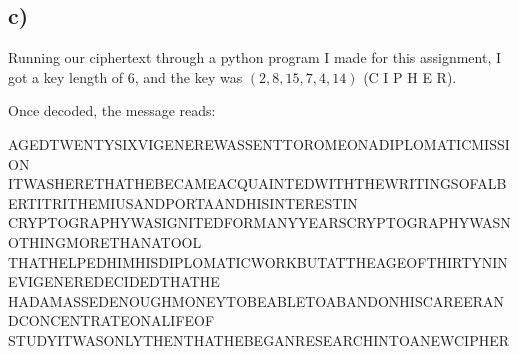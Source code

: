 \documentclass{article}
\begin{document}
\subsection*{c)}
Running our ciphertext through a python program I made for this assignment, I got
a key length of 6, and the key was $(2,8,15,7,4,14)$ (C I P H E R).

Once decoded, the message reads:

AGEDTWENTYSIXVIGENEREWASSENTTOROMEONADIPLOMATICMISSION
ITWASHERETHATHEBECAMEACQUAINTEDWITHTHEWRITINGSOFALBERTITRITHEMIUSANDPORTAANDHISINTERESTIN
CRYPTOGRAPHYWASIGNITEDFORMANYYEARSCRYPTOGRAPHYWASNOTHINGMORETHANATOOL
THATHELPEDHIMHISDIPLOMATICWORKBUTATTHEAGEOFTHIRTYNINEVIGENEREDECIDEDTHATHE
HADAMASSEDENOUGHMONEYTOBEABLETOABANDONHISCAREERANDCONCENTRATEONALIFEOF
STUDYITWASONLYTHENTHATHEBEGANRESEARCHINTOANEWCIPHER
\end{document}
